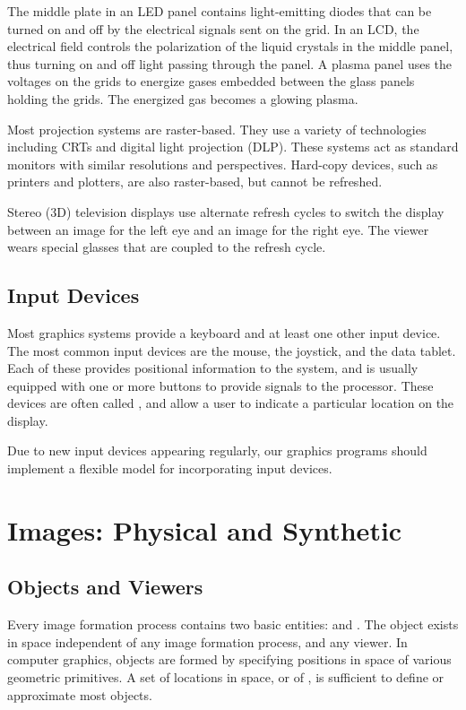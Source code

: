 \documentclass[\main/notes.tex]{subfiles}
\begin{document}
        The middle plate in an LED panel contains light-emitting diodes
        that can be turned on and off by the electrical signals sent on the grid.
        In an LCD, the electrical field controls the polarization of the liquid crystals in
        the middle panel,
        thus turning on and off light passing through the panel.
        A plasma panel uses the voltages on the grids to energize gases embedded between the
        glass panels holding the grids.
        The energized gas becomes a glowing plasma.

        Most projection systems are raster-based.
        They use a variety of technologies including CRTs and digital light projection (DLP).
        These systems act as standard monitors with similar resolutions and perspectives.
        Hard-copy devices, such as printers and plotters, are also raster-based, but cannot be
        refreshed.

        Stereo (3D) television displays use alternate refresh cycles to switch the display
        between an image for the left eye and an image for the right eye.
        The viewer wears special glasses that are coupled to the refresh cycle.

      \subsection{Input Devices}
        Most graphics systems provide a keyboard and at least one other input device.
        The most common input devices are the mouse, the joystick, and the data tablet.
        Each of these provides positional information to the system,
        and is usually equipped with one or more buttons to provide signals to the processor.
        These devices are often called ,
        and allow a user to indicate a particular location on the display.

        Due to new input devices appearing regularly,
        our graphics programs should implement a flexible model for incorporating input devices.
      \pagebreak

    \section{Images: Physical and Synthetic}
      \subsection{Objects and Viewers}
        Every image formation process contains two basic entities:
         and .
        The object exists in space independent of any image formation process, and any viewer.
        In computer graphics, objects are formed by specifying positions in space of various
        geometric primitives.
        A set of locations in space, or of , is sufficient to define or
        approximate most objects.
\end{document}
